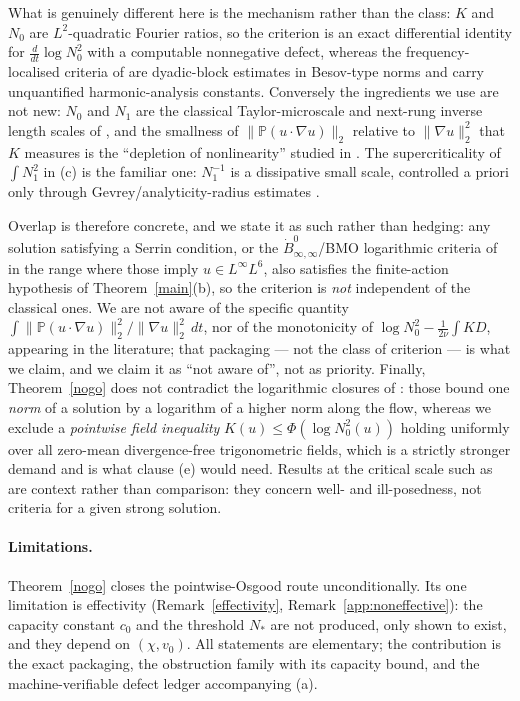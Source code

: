 \documentclass[11pt]{article}
\theoremstyle{definition}
\newcommand{\PP}{\mathbb P}
\begin{document}
What is genuinely different here is the mechanism rather than the
class: $K$ and $N_0$ are $L^2$-quadratic Fourier ratios, so the
criterion is an exact differential identity for
$\tfrac{d}{dt}\log N_0^2$ with a computable nonnegative defect, whereas
the frequency-localised criteria of
\cite{CheskidovShvydkoy2010,CheskidovShvydkoy2014,BradshawGrujic2017,CheskidovDai}
are dyadic-block estimates in Besov-type norms and carry unquantified
harmonic-analysis constants. Conversely the ingredients we use are not
new: $N_0$ and $N_1$ are the classical Taylor-microscale and next-rung
inverse length scales of
\cite{FoiasGuillopeTemam1981,BDGM1993,Gibbon1994,DoeringGibbon1995,FMRT2001},
and the smallness of $\|\PP(u\cdot\nabla u)\|_2$ relative to
$\|\nabla u\|_2^2$ that $K$ measures is the ``depletion of
nonlinearity'' studied in \cite{GibbonEtAl2014}. The supercriticality
of $\int N_1^2$ in (c) is the familiar one: $N_1^{-1}$ is a dissipative
small scale, controlled a priori only through Gevrey/analyticity-radius
estimates \cite{FoiasTemam1989,Kukavica1999}.

Overlap is therefore concrete, and we state it as such rather than
hedging: any solution satisfying a Serrin condition, or the
$\dot B^0_{\infty,\infty}$/BMO logarithmic criteria of
\cite{KozonoTaniuchi2000,KozonoOgawaTaniuchi2002} in the range where
those imply $u\in L^\infty L^6$, also satisfies the finite-action
hypothesis of Theorem~\ref{main}(b), so the
criterion is \emph{not} independent of the classical ones. We are not
aware of the specific quantity
$\int\|\PP(u\cdot\nabla u)\|_2^2/\|\nabla u\|_2^2\,dt$, nor of the
monotonicity of $\log N_0^2-\tfrac1{2\nu}\int KD$, appearing in the
literature; that packaging --- not the class of criterion --- is what
we claim, and we claim it as ``not aware of'', not as priority.
Finally, Theorem~\ref{nogo} does not contradict the logarithmic
closures of \cite{KozonoOgawaTaniuchi2002,Planchon2003}: those bound
one \emph{norm} of a solution by a logarithm of a higher norm along the
flow, whereas we exclude a \emph{pointwise field inequality}
$K(u)\le\Phi(\log N_0^2(u))$ holding uniformly over all zero-mean
divergence-free trigonometric fields, which is a strictly stronger
demand and is what clause (e) would need. Results at the critical scale
such as \cite{BourgainPavlovic2008,LeiLin2011} are context rather than
comparison: they concern well- and ill-posedness, not criteria for a
given strong solution.

\paragraph{Limitations.}
Theorem~\ref{nogo} closes the pointwise-Osgood route unconditionally.
Its one limitation is effectivity (Remark~\ref{effectivity},
Remark~\ref{app:noneffective}): the
capacity constant $c_0$ and the threshold $N_*$ are not produced, only
shown to exist, and they depend on $(\chi,v_0)$. All statements are
elementary; the
contribution is the exact packaging, the obstruction family with its
capacity bound, and the machine-verifiable defect ledger accompanying
(a).
\end{document}
